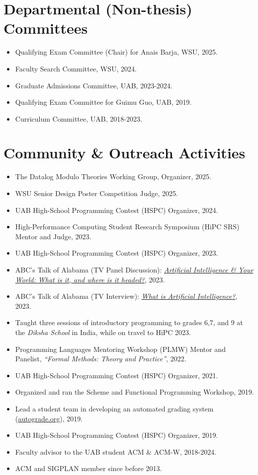 \documentclass[line]{res}
\begin{document}
\begin{resume}
\section{\large Departmental (Non-thesis) Committees} \vspace{0.45cm}
\begin{itemize}
  \item Qualifying Exam Committee (Chair) for Anais Barja, WSU, 2025.
  \item Faculty Search Committee, WSU, 2024.
  \item Graduate Admissions Committee, UAB, 2023-2024.
  \item Qualifying Exam Committee for Guimu Guo, UAB, 2019.
  \item Curriculum Committee, UAB, 2018-2023.
\end{itemize}

\section{\large Community \& Outreach Activities} \vspace{0.45cm}
\begin{itemize}
  \item The Datalog Modulo Theories Working Group, Organizer, 2025.
  \item WSU Senior Design Poster Competition Judge, 2025.
  \item UAB High-School Programming Contest (HSPC) Organizer, 2024.
  \item High-Performance Computing Student Research Symposium (HiPC SRS) Mentor and Judge, 2023.
  \item UAB High-School Programming Contest (HSPC) Organizer, 2023.
  \item ABC's Talk of Alabama (TV Panel Discussion): \href{https://tinyurl.com/abc-talk-of-alabama-gilray}{\emph{Artificial Intelligence \& Your World: What is it, and where is it headed?}}, 2023.
  \item ABC's Talk of Alabama (TV Interview): \href{https://tinyurl.com/abc-talk-of-alabama-gilray}{\emph{What is Artificial Intelligence?}}, 2023.
  \item Taught three sessions of introductory programming to grades 6,7, and 9 at the \emph{Diksha School} in India, while on travel to HiPC 2023.
  \item Programming Languages Mentoring Workshop (PLMW) Mentor and Panelist, \emph{``Formal Methods: Theory and Practice''}, 2022.
  \item UAB High-School Programming Contest (HSPC) Organizer, 2021.
  \item Organized and ran the Scheme and Functional Programming Workshop, 2019.
  \item Lead a student team in developing an automated grading system (\href{https://autograde.org}{autograde.org}), 2019.
  \item UAB High-School Programming Contest (HSPC) Organizer, 2019.  
  \item Faculty advisor to the UAB student ACM \& ACM-W, 2018-2024.
  \item ACM and SIGPLAN member since before 2013.
\end{itemize}


\end{resume}
\end{document}
